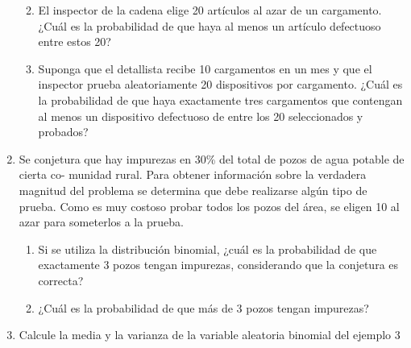 \documentclass[11pt]{article}
\providecommand{\tightlist}{%
      \setlength{\itemsep}{0pt}\setlength{\parskip}{0pt}}
\begin{document}
\begin{enumerate}
  \begin{enumerate}
  \def\labelenumii{\alph{enumii})}
  \tightlist
  \item
    El inspector de la cadena elige 20 artículos al azar de un
    cargamento. ¿Cuál es la probabilidad de que haya al menos un
    artículo defectuoso entre estos 20?
  \item
    Suponga que el detallista recibe 10 cargamentos en un mes y que el
    inspector prueba aleatoriamente 20 dispositivos por cargamento.
    ¿Cuál es la probabilidad de que haya exactamente tres cargamentos
    que contengan al menos un dispositivo defectuoso de entre los 20
    seleccionados y probados?
  \end{enumerate}
\item
  Se conjetura que hay impurezas en 30\% del total de pozos de agua
  potable de cierta co- munidad rural. Para obtener información sobre la
  verdadera magnitud del problema se determina que debe realizarse algún
  tipo de prueba. Como es muy costoso probar todos los pozos del área,
  se eligen 10 al azar para someterlos a la prueba.

  \begin{enumerate}
  \def\labelenumii{\alph{enumii})}
  \tightlist
  \item
    Si se utiliza la distribución binomial, ¿cuál es la probabilidad de
    que exactamente 3 pozos tengan impurezas, considerando que la
    conjetura es correcta?
  \item
    ¿Cuál es la probabilidad de que más de 3 pozos tengan impurezas?
  \end{enumerate}
\item
  Calcule la media y la varianza de la variable aleatoria binomial del
  ejemplo 3
\end{enumerate}
\end{document}
